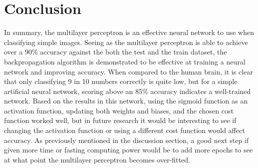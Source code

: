 \documentclass[twocolumn]{article}
\begin{document}
\section{Conclusion}
In summary, the multilayer perceptron is an effective neural network to use when classifying simple images. Seeing as the multilayer perceptron is able to achieve over a 90\% accuracy against the both the test and the train dataset, the backpropagation algorithm is demonstrated to be effective at training a neural network and improving accuracy. When compared to the human brain, it is clear that only classifying 9 in 10 numbers correctly is quite low, but for a simple artificial neural network, scoring above an 85\% accuracy indicates a well-trained network. Based on the results in this network, using the sigmoid function as an activation function, updating both weights and biases, and the chosen cost function worked well, but in future research it would be interesting to see if changing the activation function or using a different cost function would affect accuracy. As previously mentioned in the discussion section, a good next step if given more time or fasting computing power would be to add more epochs to see at what point the multilayer perceptron becomes over-fitted. 
\clearpage


\end{document}
